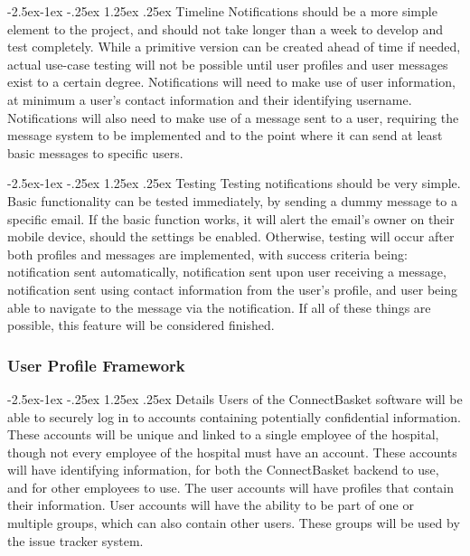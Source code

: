 \documentclass[onecolumn, draftclsnofoot,10pt, compsoc]{IEEEtran}
\makeatletter
\renewcommand\paragraph{\@startsection{paragraph}{4}{\z@}%
            {-2.5ex\@plus -1ex \@minus -.25ex}%
            {1.25ex \@plus .25ex}%
            {\normalfont\normalsize\bfseries}}
\makeatother
\begin{document}
\paragraph{Timeline}
Notifications should be a more simple element to the project, and should not take longer than a week to develop and test completely. While a primitive version can be created ahead of time if needed, actual use-case testing will not be possible until user profiles and user messages exist to a certain degree. Notifications will need to make use of user information, at minimum a user's contact information and their identifying username. Notifications will also need to make use of a message sent to a user, requiring the message system to be implemented and to the point where it can send at least basic messages to specific users.


\paragraph{Testing}
Testing notifications should be very simple. Basic functionality can be tested immediately, by sending a dummy message to a specific email. If the basic function works, it will alert the email's owner on their mobile device, should the settings be enabled. Otherwise, testing will occur after both profiles and messages are implemented, with success criteria being: notification sent automatically, notification sent upon user receiving a message, notification sent using contact information from the user's profile, and user being able to navigate to the message via the notification. If all of these things are possible, this feature will be considered finished.


\subsubsection{User Profile Framework}


\paragraph{Details}
Users of the ConnectBasket software will be able to securely log in to accounts containing potentially confidential information. These accounts will be unique and linked to a single employee of the hospital, though not every employee of the hospital must have an account. These accounts will have identifying information, for both the ConnectBasket backend to use, and for other employees to use. The user accounts will have profiles that contain their information. User accounts will have the ability to be part of one or multiple groups, which can also contain other users. These groups will be used by the issue tracker system.
\end{document}
